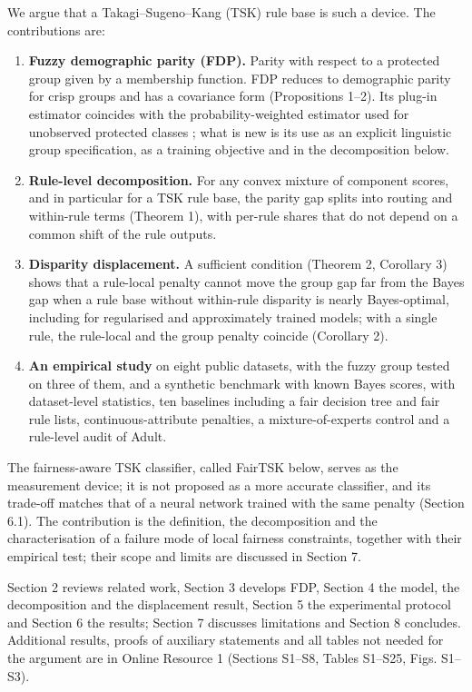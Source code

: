 We argue that a Takagi--Sugeno--Kang (TSK) rule base \cite{tsk} is such a device. The contributions are:

\begin{enumerate}
\def\labelenumi{\arabic{enumi}.}
\tightlist
\item
  \textbf{Fuzzy demographic parity (FDP).} Parity with respect to a protected group given by a membership function. FDP reduces to demographic parity for crisp groups and has a covariance form (Propositions 1--2). Its plug-in estimator coincides with the probability-weighted estimator used for unobserved protected classes \cite{chen2019,kallus2022}; what is new is its use as an explicit linguistic group specification, as a training objective and in the decomposition below.
\item
  \textbf{Rule-level decomposition.} For any convex mixture of component scores, and in particular for a TSK rule base, the parity gap splits into routing and within-rule terms (Theorem 1), with per-rule shares that do not depend on a common shift of the rule outputs.
\item
  \textbf{Disparity displacement.} A sufficient condition (Theorem 2, Corollary 3) shows that a rule-local penalty cannot move the group gap far from the Bayes gap when a rule base without within-rule disparity is nearly Bayes-optimal, including for regularised and approximately trained models; with a single rule, the rule-local and the group penalty coincide (Corollary 2).
\item
  \textbf{An empirical study} on eight public datasets, with the fuzzy group tested on three of them, and a synthetic benchmark with known Bayes scores, with dataset-level statistics, ten baselines including a fair decision tree and fair rule lists, continuous-attribute penalties, a mixture-of-experts control and a rule-level audit of Adult.
\end{enumerate}

The fairness-aware TSK classifier, called FairTSK below, serves as the measurement device; it is not proposed as a more accurate classifier, and its trade-off matches that of a neural network trained with the same penalty (Section 6.1). The contribution is the definition, the decomposition and the characterisation of a failure mode of local fairness constraints, together with their empirical test; their scope and limits are discussed in Section 7.

Section 2 reviews related work, Section 3 develops FDP, Section 4 the model, the decomposition and the displacement result, Section 5 the experimental protocol and Section 6 the results; Section 7 discusses limitations and Section 8 concludes. Additional results, proofs of auxiliary statements and all tables not needed for the argument are in Online Resource 1 (Sections S1--S8, Tables S1--S25, Figs. S1--S3).

